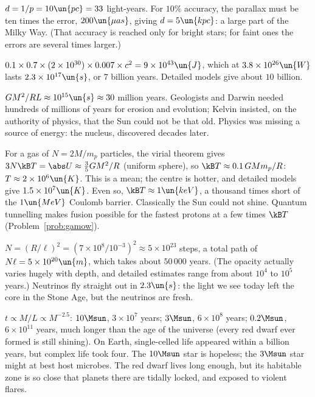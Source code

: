 
 $d = 1/p = 10\un{pc} = 33$ light-years. For $10\%$ accuracy, the parallax must be ten times the error, $200\un{\mu as}$, giving $d = 5\un{kpc}$: a large part of the Milky Way. (That accuracy is reached only for bright stars; for faint ones the errors are several times larger.)

 $0.1\times0.7\times(2\times10^{30})\times0.007\times c^2 = 9\times10^{43}\un{J}$, which at $3.8\times10^{26}\un{W}$ lasts $2.3\times10^{17}\un{s}$, or $7$ billion years. Detailed models give about $10$ billion.

 $GM^2/RL\approx10^{15}\un{s}\approx30$ million years. Geologists and Darwin needed hundreds of millions of years for erosion and evolution; Kelvin insisted, on the authority of physics, that the Sun could not be that old. Physics was missing a source of energy: the nucleus, discovered decades later.

 For a gas of $N = 2M/m_p$ particles, the virial theorem gives $3N\kB T = \abs U\approx\tfrac35GM^2/R$ (uniform sphere), so $\kB T\approx0.1\,GMm_p/R$: $T\approx2\times10^6\un{K}$. This is a mean; the centre is hotter, and detailed models give $1.5\times10^7\un{K}$. Even so, $\kB T\approx1\un{keV}$, a thousand times short of the $1\un{MeV}$ Coulomb barrier. Classically the Sun could not shine. Quantum tunnelling makes fusion possible for the fastest protons at a few times $\kB T$ (Problem~\ref{prob:gamow}).

 $N = (R/\ell)^2 = (7\times10^8/10^{-3})^2\approx5\times10^{23}$ steps, a total path of $N\ell = 5\times10^{20}\un{m}$, which takes about $50\,000$ years. (The opacity actually varies hugely with depth, and detailed estimates range from about $10^4$ to $10^5$ years.) Neutrinos fly straight out in $2.3\un{s}$: the light we see today left the core in the Stone Age, but the neutrinos are fresh.

 $t\propto M/L\propto M^{-2.5}$: $10\Msun$, $3\times10^7$ years; $3\Msun$, $6\times10^8$ years; $0.2\Msun$, $6\times10^{11}$ years, much longer than the age of the universe (every red dwarf ever formed is still shining). On Earth, single-celled life appeared within a billion years, but complex life took four. The $10\Msun$ star is hopeless; the $3\Msun$ star might at best host microbes. The red dwarf lives long enough, but its habitable zone is so close that planets there are tidally locked, and exposed to violent flares.

